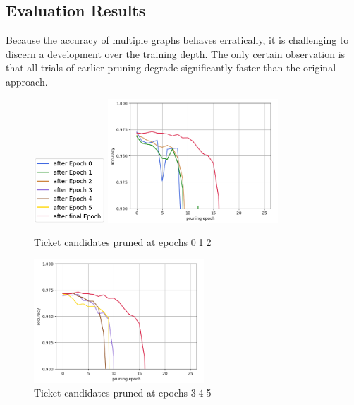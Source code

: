 \subsection*{Evaluation Results}
Because the accuracy of multiple graphs behaves erratically, it is challenging to discern a development over the training depth. The only certain observation is that all trials of earlier pruning degrade significantly faster than the original approach.
\begin{figure}
	\begin{minipage}{\textwidth}
		\centering
		\includegraphics[width=100px]{gfx/7-Evaluation/LTH_5_legend.png}
	\end{minipage}
	\begin{minipage}{0.5\textwidth}
		\centering
		\includegraphics[height=175px]{gfx/Experiments/EarlyTicket-MNIST-FCN/012.png}
		\caption*{Ticket candidates pruned at epochs 0|1|2}
		\label{?}
	\end{minipage}\hfill
	\begin{minipage}{0.5\textwidth}
		\centering
		\includegraphics[height=175px]{gfx/Experiments/EarlyTicket-MNIST-FCN/345.png}
		\caption*{Ticket candidates pruned at epochs 3|4|5}
		\label{?}
	\end{minipage}
\end{figure}
